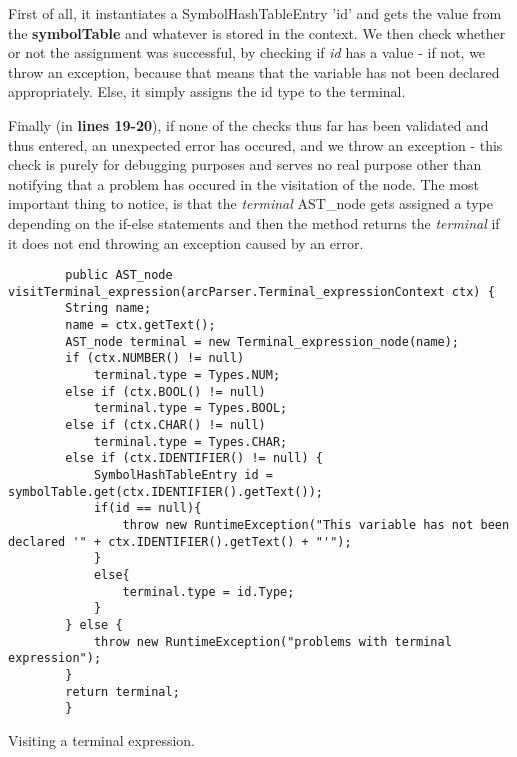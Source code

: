 First of all, it instantiates a SymbolHashTableEntry 'id' and gets the value from the \textbf{symbolTable} and whatever is stored in the context. We then check whether or not the assignment was successful, by checking if \textit{id} has a value - if not, we throw an exception, because that means that the variable has not been declared appropriately. Else, it simply assigns the id type to the terminal.






Finally (in \textbf{lines 19-20}), if none of the checks thus far has been validated and thus entered, an unexpected error has occured, and we throw an exception - this check is purely for debugging purposes and serves no real purpose other than notifying that a problem has occured in the visitation of the node. The most important thing to notice, is that the \textit{terminal} AST\_node gets assigned a type depending on the if-else statements and then the method returns the \textit{terminal} if it does not end throwing an exception caused by an error.

\begin{listing}[htb!]
    \begin{verbatim}
        public AST_node visitTerminal_expression(arcParser.Terminal_expressionContext ctx) {
        String name;
        name = ctx.getText();
        AST_node terminal = new Terminal_expression_node(name);
        if (ctx.NUMBER() != null)
            terminal.type = Types.NUM;
        else if (ctx.BOOL() != null)
            terminal.type = Types.BOOL;
        else if (ctx.CHAR() != null)
            terminal.type = Types.CHAR;
        else if (ctx.IDENTIFIER() != null) {
            SymbolHashTableEntry id = symbolTable.get(ctx.IDENTIFIER().getText());
            if(id == null){
                throw new RuntimeException("This variable has not been declared '" + ctx.IDENTIFIER().getText() + "'");
            }
            else{
                terminal.type = id.Type;
            }
        } else {
            throw new RuntimeException("problems with terminal expression");
        }
        return terminal;
        }
    \end{verbatim}
    \caption{Visiting a terminal expression.}
    \label{lst:visitorterminalexpression}
\end{listing}

